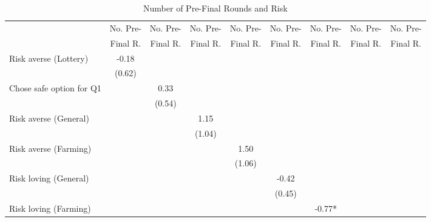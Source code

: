 \begin{table}[htbp]
\centering
\hspace*{-1.2cm}
\begin{threeparttable}
\small
\caption{Number of Pre-Final Rounds and Risk }
\label{tab:B3}
\begin{tabular}{l cccccccc}
\hline
\hline
& No. Pre- & No. Pre- & No. Pre- & No. Pre- & No. Pre- & No. Pre- & No. Pre- & No. Pre- \\
& Final R. & Final R. & Final R. & Final R. & Final R. & Final R. & Final R. & Final R.  \\ \hline
Risk averse (Lottery)&       -0.18   &               &               &               &               &               &               &               \\
                    &      (0.62)   &               &               &               &               &               &               &               \\
Chose safe option for Q1&               &        0.33   &               &               &               &               &               &               \\
                    &               &      (0.54)   &               &               &               &               &               &               \\
Risk averse (General)&               &               &        1.15   &               &               &               &               &               \\
                    &               &               &      (1.04)   &               &               &               &               &               \\
Risk averse (Farming)&               &               &               &        1.50   &               &               &               &               \\
                    &               &               &               &      (1.06)   &               &               &               &               \\
Risk loving (General)&               &               &               &               &       -0.42   &               &               &               \\
                    &               &               &               &               &      (0.45)   &               &               &               \\
Risk loving (Farming)&               &               &               &               &               &       -0.77*  &               &               \\

\end{tabular}
\end{threeparttable}
\end{table}
